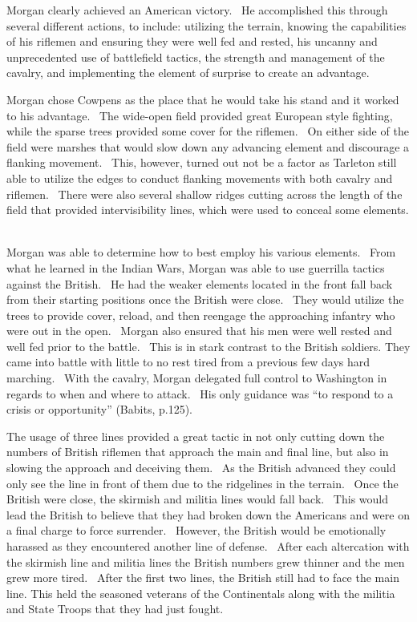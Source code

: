 Morgan clearly achieved an American victory.  He accomplished this through
several different actions, to include: utilizing the terrain, knowing the
capabilities of his riflemen and ensuring they were well fed and rested, his
uncanny and unprecedented use of battlefield tactics, the strength and
management of the cavalry, and implementing the element of surprise to create an
advantage.  

Morgan chose Cowpens as the place that he would take his stand and it worked to
his advantage.  The wide-open field provided great European style fighting,
while the sparse trees provided some cover for the riflemen.  On either side of
the field were marshes that would slow down any advancing element and discourage
a flanking movement.  This, however, turned out not be a factor as Tarleton
still able to utilize the edges to conduct flanking movements with both cavalry
and riflemen.  There were also several shallow ridges cutting across the length
of the field that provided intervisibility lines, which were used to conceal
some elements.  

Morgan was able to determine how to best employ his various elements.  From what
he learned in the Indian Wars, Morgan was able to use guerrilla tactics against
the British.  He had the weaker elements located in the front fall back from
their starting positions once the British were close.  They would utilize the
trees to provide cover, reload, and then reengage the approaching infantry who
were out in the open.  Morgan also ensured that his men were well rested and
well fed prior to the battle.  This is in stark contrast to the British
soldiers.  They came into battle with little to no rest tired from a previous
few days hard marching.  With the cavalry, Morgan delegated full control to
Washington in regards to when and where to attack.  His only guidance was “to
respond to a crisis or opportunity” (Babits, p.125).  

The usage of three lines provided a great tactic in not only cutting down the
numbers of British riflemen that approach the main and final line, but also in
slowing the approach and deceiving them.  As the British advanced they could
only see the line in front of them due to the ridgelines in the terrain.  Once
the British were close, the skirmish and militia lines would fall back.  This
would lead the British to believe that they had broken down the Americans and
were on a final charge to force surrender.  However, the British would be
emotionally harassed as they encountered another line of defense.  After each
altercation with the skirmish line and militia lines the British numbers grew
thinner and the men grew more tired.  After the first two lines, the British
still had to face the main line.  This held the seasoned veterans of the
Continentals along with the militia and State Troops that they had just fought.
 

